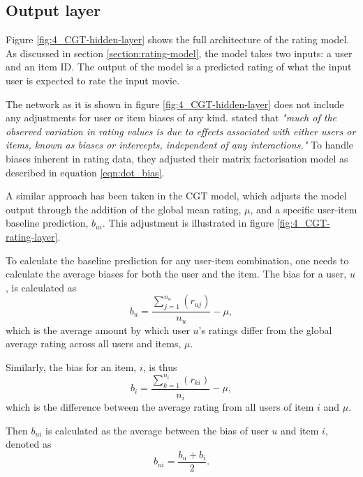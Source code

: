 \subsection{Output layer}
Figure \ref{fig:4_CGT-hidden-layer} shows the full architecture of the rating model. As discussed in section \ref{section:rating-model}, the model takes two inputs: a user and an item ID. The output of the model is a predicted rating of what the input user is expected to rate the input movie. 

The network as it is shown in figure \ref{fig:4_CGT-hidden-layer} does not include any adjustments for user or item biases of any kind. \citeauthor{koren2009matrix} stated that \textit{"much of the observed variation in rating values is due to effects associated with either users or items, known as biases or intercepts, independent of any interactions."} To handle biases inherent in rating data, they adjusted their matrix factorisation model as described in equation \ref{eqn:dot_bias}.

A similar approach has been taken in the CGT model, which adjusts the model output through the addition of the global mean rating, $\mu$, and a specific user-item baseline prediction, $b_{ui}$. This adjustment is illustrated in figure \ref{fig:4_CGT-rating-layer}. 

To calculate the baseline prediction for any user-item combination, one needs to calculate the average biases for both the user and the item. The bias for a user, $u$, is calculated as 
\begin{equation}
    b_{u} = \dfrac{\sum_{j=1}^{n_u} (r_{uj})}{n_u} - \mu,
\label{eqn:CGT-user-bias}
\end{equation}
which is the average amount by which user $u$'s ratings differ from the global average rating across all users and items, $\mu$.

Similarly, the bias for an item, $i$, is thus
\begin{equation}
    b_{i} = \dfrac{\sum_{k=1}^{n_i} (r_{ki})}{n_i} - \mu,
\label{eqn:CGT-item-bias}
\end{equation}
which is the difference between the average rating from all users of item $i$ and $\mu$.

Then $b_{ui}$ is calculated as the average between the bias of user $u$ and item $i$, denoted as
\begin{equation}
    b_{ui} = \dfrac{b_u + b_i}{2}.
\label{eqn:CGT-baseline}
\end{equation}

